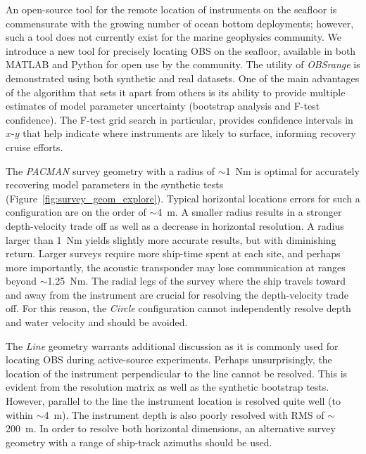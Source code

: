 An open-source tool for the remote location of instruments on the seafloor is commensurate with the growing number of ocean bottom deployments; however, such a tool does not currently exist for the marine geophysics community. We introduce a new tool for precisely locating OBS on the seafloor, available in both MATLAB and Python for open use by the community. The utility of \textit{OBSrange} is demonstrated using both synthetic and real datasets. One of the main advantages of the algorithm that sets it apart from others is its ability to provide multiple estimates of model parameter uncertainty (bootstrap analysis and F-test confidence). The F-test grid search in particular, provides confidence intervals in $x$-$y$ that help indicate where instruments are likely to surface, informing recovery cruise efforts.

The \textit{PACMAN} survey geometry with a radius of $\sim$1~Nm is optimal for accurately recovering model parameters in the synthetic tests (Figure~\ref{fig:survey_geom_explore}). Typical horizontal locations errors for such a configuration are on the order of $\sim$4~m. A smaller radius results in a stronger depth-velocity trade off as well as a decrease in horizontal resolution. A radius larger than 1~Nm yields slightly more accurate results, but with diminishing return. Larger surveys require more ship-time spent at each site, and perhaps more importantly, the acoustic transponder may lose communication at ranges beyond $\sim$1.25~Nm. The radial legs of the survey where the ship travels toward and away from the instrument are crucial for resolving the depth-velocity trade off. For this reason, the \textit{Circle} configuration cannot independently resolve depth and water velocity and should be avoided. 

The \textit{Line} geometry warrants additional discussion as it is commonly used for locating OBS during active-source experiments. Perhaps unsurprisingly, the location of the instrument perpendicular to the line cannot be resolved. This is evident from the resolution matrix as well as the synthetic bootstrap tests. However, parallel to the line the instrument location is resolved quite well (to within $\sim$4~m). The instrument depth is also poorly resolved with RMS of $\sim$200~m. In order to resolve both horizontal dimensions, an alternative survey geometry with a range of ship-track azimuths should be used.

